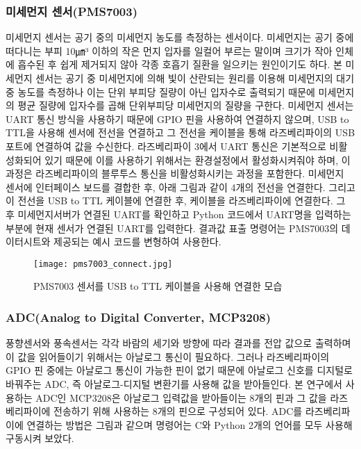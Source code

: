 \subsubsection{미세먼지 센서(PMS7003)}
미세먼지 센서는 공기 중의 미세먼지 농도를 측정하는 센서이다. 미세먼지는 공기 중에 떠다니는 부피 10㎛³ 이하의 작은 먼지 입자를 일컬어 부르는 말이며 크기가 작아 인체에 흡수된 후 쉽게 제거되지 않아 각종 호흡기 질환을 일으키는 원인이기도 하다. 본 미세먼지 센서는 공기 중 미세먼지에 의해 빛이 산란되는 원리를 이용해 미세먼지의 대기 중 농도를 측정하나 이는 단위 부피당 질량이 아닌 입자수로 출력되기 때문에 미세먼지의 평균 질량에 입자수를 곱해 단위부피당 미세먼지의 질량을 구한다. 미세먼지 센서는 UART 통신 방식을 사용하기 때문에 GPIO 핀을 사용하여 연결하지 않으며, USB to TTL을 사용해 센서에 전선을 연결하고 그 전선을 케이블을 통해 라즈베리파이의 USB 포트에 연결하여 값을 수신한다. 라즈베리파이 3에서 UART 통신은 기본적으로 비활성화되어 있기 때문에 이를 사용하기 위해서는 환경설정에서 활성화시켜줘야 하며, 이 과정은 라즈베리파이의 블루투스 통신을 비활성화시키는 과정을 포함한다.
미세먼지 센서에 인터페이스 보드를 결합한 후, 아래 그림과 같이 4개의 전선을 연결한다. 그리고 이 전선을 USB to TTL 케이블에 연결한 후, 케이블을 라즈베리파이에 연결한다. 그 후 미세먼지서버가 연결된 UART를 확인하고 Python 코드에서 UART명을 입력하는 부분에 현재 센서가 연결된 UART를 입력한다. 결과값 표출 명령어는 PMS7003의 데이터시트와 제공되는 예시 코드를 변형하여 사용한다.

\begin{figure}[htbp]
	\centering
	\texttt{[image: pms7003\_connect.jpg]}
	\caption{PMS7003 센서를 USB to TTL 케이블을 사용해 연결한 모습}
	\label{PMS7003}
\end{figure}

\subsubsection{ADC(Analog to Digital Converter, MCP3208)}
풍향센서와 풍속센서는 각각 바람의 세기와 방향에 따라 결과를 전압 값으로 출력하며 이 값을 읽어들이기 위해서는 아날로그 통신이 필요하다. 그러나 라즈베리파이의 GPIO 핀 중에는 아날로그 통신이 가능한 핀이 없기 때문에 아날로그 신호를 디지털로 바꿔주는 ADC, 즉 아날로그-디지털 변환기를 사용해 값을 받아들인다. 본 연구에서 사용하는 ADC인 MCP3208은 아날로그 입력값을 받아들이는 8개의 핀과 그 값을 라즈베리파이에 전송하기 위해 사용하는 8개의 핀으로 구성되어 있다. ADC를 라즈베리파이에 연결하는 방법은 그림과 같으며 명령어는 C와 Python 2개의 언어를 모두 사용해 구동시켜 보았다.

